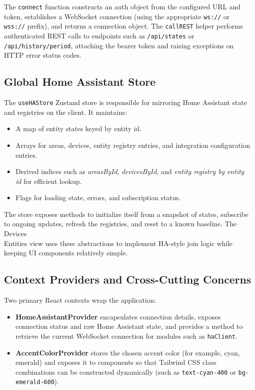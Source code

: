\documentclass[11pt,a4paper]{article}
\begin{document}
The \texttt{connect} function constructs an auth object from the configured URL and token, establishes a WebSocket connection (using the appropriate \texttt{ws://} or \texttt{wss://} prefix), and returns a connection object. The \texttt{callREST} helper performs authenticated REST calls to endpoints such as \texttt{/api/states} or \texttt{/api/history/period}, attaching the bearer token and raising exceptions on HTTP error status codes.

\subsection{Global Home Assistant Store}

The \texttt{useHAStore} Zustand store is responsible for mirroring Home Assistant state and registries on the client. It maintains:
\begin{itemize}[leftmargin=*]
  \item A map of entity states keyed by entity id.
  \item Arrays for areas, devices, entity registry entries, and integration configuration entries.
  \item Derived indices such as \emph{areasById}, \emph{devicesById}, and \emph{entity registry by entity id} for efficient lookup.
  \item Flags for loading state, errors, and subscription status.
\end{itemize}

The store exposes methods to initialize itself from a snapshot of states, subscribe to ongoing updates, refresh the registries, and reset to a known baseline. The Devices \\ Entities view uses these abstractions to implement HA-style join logic while keeping UI components relatively simple.

\subsection{Context Providers and Cross-Cutting Concerns}

Two primary React contexts wrap the application:
\begin{itemize}[leftmargin=*]
  \item \textbf{HomeAssistantProvider} encapsulates connection details, exposes connection status and raw Home Assistant state, and provides a method to retrieve the current WebSocket connection for modules such as \texttt{haClient}.
  \item \textbf{AccentColorProvider} stores the chosen accent color (for example, cyan, emerald) and exposes it to components so that Tailwind CSS class combinations can be constructed dynamically (such as \texttt{text-cyan-400} or \texttt{bg-emerald-600}).
\end{itemize}
\end{document}
